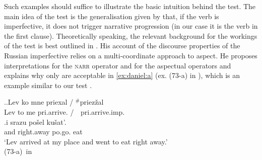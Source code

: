 Such examples should suffice to illustrate the basic intuition behind the test. The main idea of the test is the generalisation given by \citet{Jespersen:24} that, if the verb is imperfective, it does not trigger narrative progression (in our case it is the verb in the first clause). Theoretically speaking, the relevant background for the workings of the test is best outlined in \citet{Altshuler:12}.
His account of the discourse properties of the Russian imperfective  relies on a multi-coordinate approach to aspect. He proposes interpretations for the \textsc{narr} operator and for the aspectual operators and explains why only  are acceptable in \ref{ex:daniel:a} (ex. (73-a) in \citealt{Altshuler:12}), which is an example similar to our test .

\ex.\label{ex:daniel}\ag.\label{ex:daniel:a}Lev ko mne \textsuperscript{\JudgeOK}priexal\textsuperscript{\PF} / {{$^{\#}$}priez\v{z}al\textsuperscript{\IPF}}\\
Lev to me {pri.arrive.} / {{\textcolor{white} {$^{\#}$}}pri.arrive.imp.}\\
\bg.i srazu po\v{s}el\textsuperscript{\PF} ku\v{s}at'.\\
and right.away po.go. eat\\
\trans `Lev arrived at my place and went to eat right away.'\\
\hbox{}\hfill\hbox{(73-a) in \citet{Altshuler:12}}


